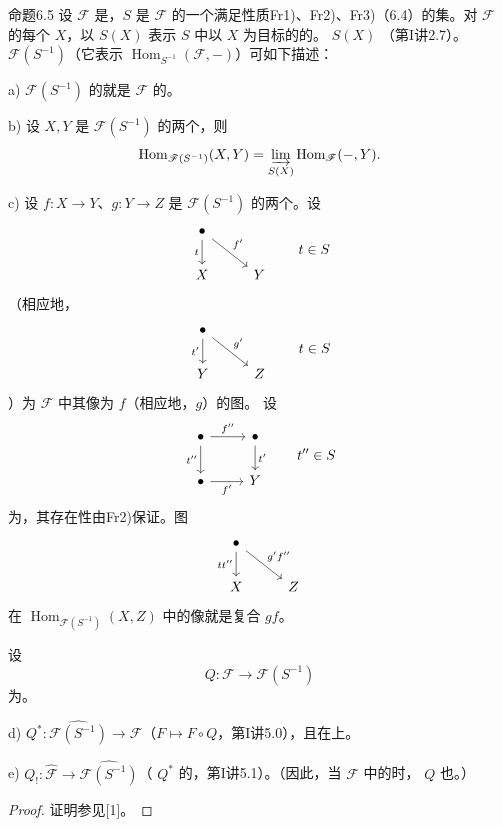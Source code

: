 \begin{SGAresult}{命题}{6.5}
设 $\mathscr F$ 是，$S$ 是 $\mathscr F$ 的一个满足性质Fr1)、Fr2)、Fr3)（6.4）的集。对 $\mathscr F$ 的每个 $X$，以 $S(X)$ 表示 $S$ 中以 $X$ 为目标的的。 $S(X)$ （第I讲2.7）。 $\mathscr F(S^{-1})$（它表示 $\operatorname{Hom}_{S^{-1}}(\mathscr F,-)$）可如下描述：

a) $\mathscr F(S^{-1})$ 的就是 $\mathscr F$ 的。

b) 设 $X,Y$ 是 $\mathscr F(S^{-1})$ 的两个，则
\[
\operatorname{Hom}_{\mathscr F(S^{-1})}(X,Y)
=\varinjlim_{S(X)}\operatorname{Hom}_{\mathscr F}(-,Y).
\]

c) 设 $f:X\to Y$、$g:Y\to Z$ 是 $\mathscr F(S^{-1})$ 的两个。设
\[
\begin{tikzcd}
\bullet\arrow[d,"t"']\arrow[dr,"f'"]&\\
X&Y
\end{tikzcd}\qquad t\in S
\]
（相应地，
\[
\begin{tikzcd}
\bullet\arrow[d,"t'"']\arrow[dr,"g'"]&\\
Y&Z
\end{tikzcd}\qquad t\in S
\]
）为 $\mathscr F$ 中其像为 $f$（相应地，$g$）的图。
设
\[
\begin{tikzcd}
\bullet\arrow[d,"t''"']\arrow[r,"f''"]&\bullet\arrow[d,"t'"]\\
\bullet\arrow[r,"f'"']&Y
\end{tikzcd}\qquad t''\in S
\]
为，其存在性由Fr2)保证。图
\[
\begin{tikzcd}
\bullet\arrow[d,"tt''"']\arrow[dr,"g'f''"]&\\
X&Z
\end{tikzcd}
\]
在 $\operatorname{Hom}_{\mathscr F(S^{-1})}(X,Z)$ 中的像就是复合 $gf$。

设
\[
Q:\mathscr F\longrightarrow\mathscr F(S^{-1})
\]
为。

d)  $Q^*:\widehat{\mathscr F(S^{-1})}\to\widehat{\mathscr F}$（$F\mapsto F\circ Q$，第I讲5.0），且在上。

e)  $Q_!:\widehat{\mathscr F}\to\widehat{\mathscr F(S^{-1})}$（ $Q^*$ 的，第I讲5.1）。（因此，当 $\mathscr F$ 中的时， $Q$ 也。）
\end{SGAresult}
\begin{proof}
证明参见[1]。
\end{proof}


